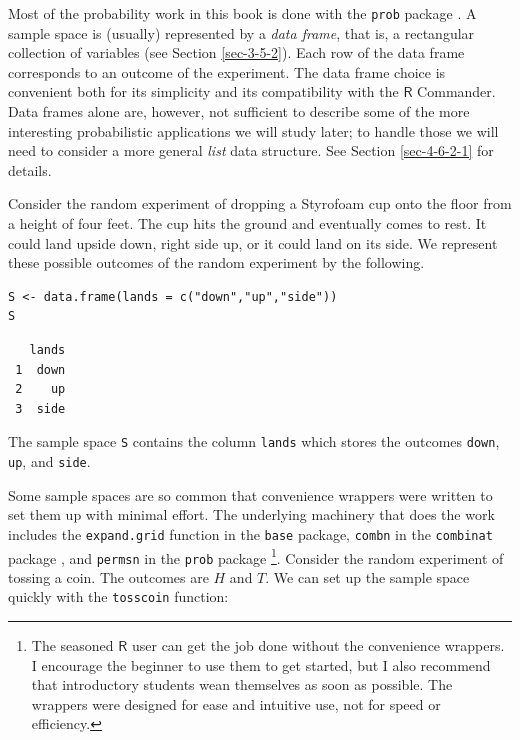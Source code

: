 \documentclass[captions=tableheading]{scrbook}
\begin{document}
Most of the probability work in this book is done with the \texttt{prob} package \cite{Kernsprob}. A sample space is (usually) represented by a \emph{data frame}, that is, a rectangular collection of variables (see Section \ref{sec-3-5-2}). Each row of the data frame corresponds to an outcome of the experiment. The data frame choice is convenient both for its simplicity and its compatibility with the \(\mathsf{R}\) Commander. Data frames alone are, however, not sufficient to describe some of the more interesting probabilistic applications we will study later; to handle those we will need to consider a more general \emph{list} data structure. See Section \ref{sec-4-6-2-1} for details.

\begin{example}
Consider the random experiment of dropping a Styrofoam cup onto the floor from a height of four feet. The cup hits the ground and eventually comes to rest. It could land upside down, right side up, or it could land on its side. We represent these possible outcomes of the random experiment by the following.


\lstset{language=R}
\begin{lstlisting}
S <- data.frame(lands = c("down","up","side"))
S
\end{lstlisting}

\begin{verbatim}
   lands
 1  down
 2    up
 3  side
\end{verbatim}

The sample space \texttt{S} contains the column \texttt{lands} which stores the outcomes \texttt{down}, \texttt{up}, and \texttt{side}. 

\end{example}

Some sample spaces are so common that convenience wrappers were written to set them up with minimal effort. The underlying machinery that does the work includes the \texttt{expand.grid} function in the \texttt{base} package, \texttt{combn} in the \texttt{combinat} package \cite{combinat}, and \texttt{permsn} in the \texttt{prob} package
\footnote{The seasoned \(\mathsf{R}\) user can get the job done without the convenience wrappers. I encourage the beginner to use them to get started, but I also recommend that introductory students wean themselves as soon as possible. The wrappers were designed for ease and intuitive use, not for speed or efficiency.}.
Consider the random experiment of tossing a coin. The outcomes are \(H\) and \(T\). We can set up the sample space quickly with the \texttt{tosscoin} function:
\end{document}
